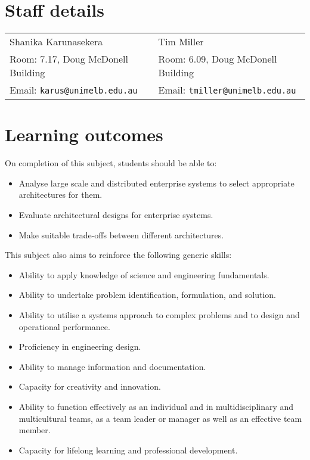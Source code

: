 \section*{Staff details}

\begin{tabular}{p{}p{}}
Shanika Karunasekera & Tim Miller\\
Room: 7.17, Doug McDonell Building & Room: 6.09, Doug McDonell Building \\
Email: \texttt{karus@unimelb.edu.au} & Email: \texttt{tmiller@unimelb.edu.au}\\
\end{tabular}


\section*{Learning outcomes}

On completion of this subject, students should be able to:

\begin{itemize}

  \item Analyse large scale and distributed enterprise systems to select appropriate architectures for them.

  \item Evaluate architectural designs for enterprise systems.

 \item Make suitable trade-offs between different architectures.

\end{itemize}

	
This subject also aims to reinforce the following generic skills:

\begin{itemize}

 \item Ability to apply knowledge of science and engineering fundamentals.

 \item Ability to undertake problem identification, formulation, and solution.

 \item Ability to utilise a systems approach to complex problems and to design and operational performance.

 \item Proficiency in engineering design.
 
 \item Ability to manage information and documentation.

  \item Capacity for creativity and innovation.

  \item Ability to function effectively as an individual and in multidisciplinary and multicultural teams, as a team leader or manager as well as an effective team member.

 \item Capacity for lifelong learning and professional development.

\end{itemize}


